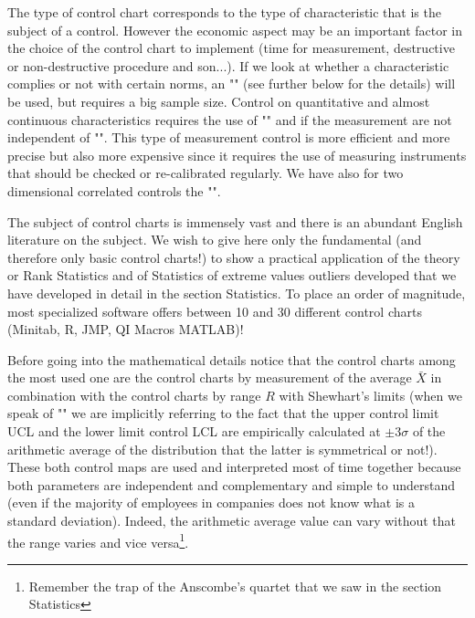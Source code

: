 	The type of control chart corresponds to the type of characteristic that is the subject of a control. However the economic aspect may be an important factor in the choice of the control chart to implement (time for measurement, destructive or non-destructive procedure and son...). If we look at whether a characteristic complies or not with certain norms, an "" (see further below for the details) will be used, but requires a big sample size. Control on quantitative and almost continuous characteristics requires the use of "" and if the measurement are not independent of "". This type of measurement control is more efficient and more precise but also more expensive since it requires the use of measuring instruments that should be checked or re-calibrated regularly. We have also for two dimensional correlated controls the "".
	\begin{tcolorbox}[title=Remark,colframe=black,arc=10pt]
	The subject of control charts is immensely vast and there is an abundant English literature on the subject. We wish to give here only the fundamental (and therefore only basic control charts!) to show a practical application of the theory or Rank Statistics and of Statistics of extreme values outliers developed that we have developed in detail in the section Statistics. To place an order of magnitude, most specialized software offers between 10 and 30 different control charts (Minitab, R, JMP, QI Macros MATLAB)!
	\end{tcolorbox}
	Before going into the mathematical details notice that the control charts among the most used one are the control charts by measurement  of the average $\bar{X}$ in combination with the control charts by range $R$ with Shewhart's limits (when we speak of "" we are implicitly referring to the fact that the upper control limit UCL and the lower limit control LCL are empirically calculated at $\pm 3\sigma$ of the arithmetic average of the distribution that the latter is symmetrical or not!). These both control maps are used and interpreted most of time together because both parameters are independent and complementary and simple to understand (even if the majority of employees in companies does not know what is a standard deviation). Indeed, the arithmetic average value can vary without that the range varies and vice versa\footnote{Remember the trap of the Anscombe's quartet that we saw in the section Statistics}.
